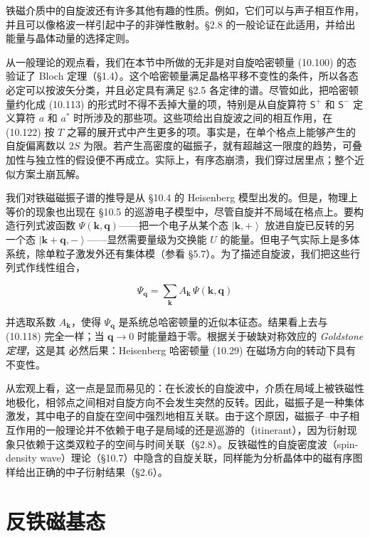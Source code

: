 铁磁介质中的自旋波还有许多其他有趣的性质。例如，它们可以与声子相互作用，并且可以像格波一样引起中子的非弹性散射。§2.8 的一般论证在此适用，并给出能量与晶体动量的选择定则。

从一般理论的观点看，我们在本节中所做的无非是对自旋哈密顿量 (10.100) 的态验证了 Bloch 定理（§1.4）。这个哈密顿量满足晶格平移不变性的条件，所以各态必定可以按波矢分类，并且必定具有满足 §2.5 各定律的谱。尽管如此，把哈密顿量约化成 (10.113) 的形式时不得不丢掉大量的项，特别是从自旋算符 $\mathsf{S}^{+}$ 和 $\mathsf{S}^{-}$ 定义算符 $a$ 和 $a^{*}$ 时所涉及的那些项。这些项给出自旋波之间的相互作用，在 (10.122) 按 $T$ 之幂的展开式中产生更多的项。事实是，在单个格点上能够产生的自旋偏离数以 $2S$ 为限。若产生高密度的磁振子，就有超越这一限度的趋势，可叠加性与独立性的假设便不再成立。实际上，有序态崩溃，我们穿过居里点；整个近似方案土崩瓦解。

我们对铁磁磁振子谱的推导是从 §10.4 的 Heisenberg 模型出发的。但是，物理上等价的现象也出现在 §10.5 的巡游电子模型中，尽管自旋并不局域在格点上。要构造行列式波函数 $\Psi(\mathbf{k},\mathbf{q})$——把一个电子从某个态 $\left|\mathbf{k},+\right\rangle$ 放进自旋已反转的另一个态 $\left|\mathbf{k}+\mathbf{q},-\right\rangle$——显然需要量级为交换能 $U$ 的能量。但电子气实际上是多体系统，除单粒子激发外还有集体模（参看 §5.7）。为了描述自旋波，我们把这些行列式作线性组合，

\begin{equation*}
\Psi_{\mathbf{q}} = \sum_{\mathbf{k}} A_{\mathbf{k}}\,\Psi(\mathbf{k},\mathbf{q})
\tag{10.123}
\end{equation*}

并选取系数 $A_{\mathbf{k}}$，使得 $\Psi_{\mathbf{q}}$ 是系统总哈密顿量的近似本征态。结果看上去与 (10.118) 完全一样；当 $\mathbf{q}\to 0$ 时能量趋于零。根据关于破缺对称效应的 \emph{Goldstone 定理}，这是其
必然后果：Heisenberg 哈密顿量 (10.29) 在磁场方向的转动下具有不变性。

从宏观上看，这一点是显而易见的：在长波长的自旋波中，介质在局域上被铁磁性地极化，相邻点之间相对自旋方向不会发生突然的反转。因此，磁振子是一种集体激发，其中电子的自旋在空间中强烈地相互关联。由于这个原因，磁振子–中子相互作用的一般理论并不依赖于电子是局域的还是巡游的（itinerant），因为衍射现象只依赖于这类双粒子的空间与时间关联（§2.8）。反铁磁性的自旋密度波（spin-density wave）理论（§10.7）中隐含的自旋关联，同样能为分析晶体中的磁有序图样给出正确的中子衍射结果（§2.6）。

\section{反铁磁基态}

